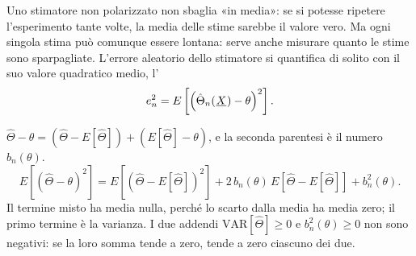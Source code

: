 
Uno stimatore non polarizzato non sbaglia «in media»: se si potesse ripetere l'esperimento tante volte, la media delle
stime sarebbe il valore vero. Ma ogni singola stima può comunque essere lontana: serve anche misurare quanto le stime
sono sparpagliate. L'errore aleatorio dello stimatore si quantifica di solito con il suo valore quadratico medio,
l'
\[ e_n^2 = E\left[ \left( \hat\Theta_n({\mkern1mu\underline{X}\mkern1mu}) - \theta \right)^2 \right] . \]


\begin{dimostrazione}
 $\hat\Theta - \theta = \left( \hat\Theta - E[\hat\Theta] \right) + \left(
E[\hat\Theta] - \theta \right)$, e la seconda parentesi è il numero $b_n(\theta)$.
\[ E\left[ \left( \hat\Theta - \theta \right)^2 \right] = E\left[ \left( \hat\Theta - E[\hat\Theta] \right)^2 \right] +
   2\, b_n(\theta)\, E\left[ \hat\Theta - E[\hat\Theta] \right] + b_n^2(\theta) . \]
Il termine misto ha media nulla, perché lo scarto dalla media ha media zero; il primo termine è la varianza.
 I due addendi $\mathrm{VAR}[\hat\Theta] \geq 0$ e $b_n^2(\theta) \geq 0$ non sono negativi: se
la loro somma tende a zero, tende a zero ciascuno dei due.
\end{dimostrazione}

